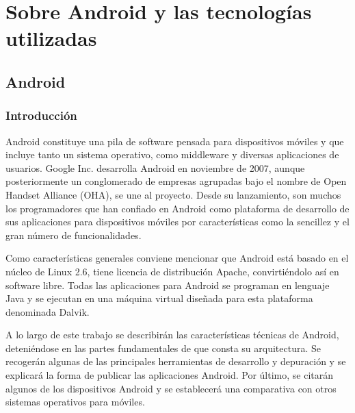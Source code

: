 \documentclass[12 pt, a4paper, twoside]{article}
\begin{document}


\newpage

\tableofcontents

\newpage

\section{Sobre Android y las tecnologías utilizadas}
\subsection{Android}
\subsubsection{Introducción}
Android constituye una pila de software pensada para dispositivos móviles y
que incluye tanto un sistema operativo, como middleware y diversas aplicaciones
de usuarios. Google Inc. desarrolla Android en noviembre de 2007, aunque
posteriormente un conglomerado de empresas agrupadas bajo el nombre de Open
Handset Alliance (OHA), se une al proyecto. Desde su lanzamiento, son muchos
los programadores que han confiado en Android como plataforma de desarrollo de
sus aplicaciones para dispositivos móviles por características como la sencillez y
el gran número de funcionalidades.

Como características generales conviene mencionar que Android está basado en
el núcleo de Linux 2.6, tiene licencia de distribución Apache, convirtiéndolo así en
software libre. Todas las aplicaciones para Android se programan en lenguaje Java
y se ejecutan en una máquina virtual diseñada para esta plataforma denominada
Dalvik.

A lo largo de este trabajo se describirán las características técnicas de Android,
deteniéndose en las partes fundamentales de que consta su arquitectura. Se recogerán
algunas de las principales herramientas de desarrollo y depuración y se
explicará la forma de publicar las aplicaciones Android. Por último, se citarán
algunos de los dispositivos Android y se establecerá una comparativa con otros
sistemas operativos para móviles.
\end{document}
